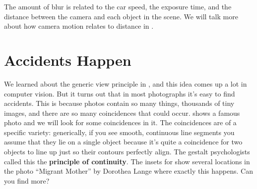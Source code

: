The amount of blur is related to the car speed, the exposure time, and the distance between the camera and each object in the scene. We will talk more about how camera motion relates to distance in \chap{\ref{chapter:3D_motion_and_its_2D_projection}}.

\section{Accidents Happen}

We learned about the generic view principle in \chap{\ref{chapter:simplesystem}}, and this idea comes up a lot in computer vision. But it turns out that in most photographs it's easy to find accidents. This is because photos contain so many things, thousands of tiny images, and there are so many coincidences that could occur. \Fig{\ref{fig:visionscience:migrant_mother}} shows a famous photo and we will look for some coincidences in it. The coincidences are of a specific variety: generically, if you see smooth, continuous line segments you assume that they lie on a single object because it's quite a coincidence for two objects to line up just so their contours perfectly align. The gestalt psychologists called this the {\bf principle of continuity}. The insets  for \fig{\ref{fig:visionscience:migrant_mother}} show several locations in the photo ``Migrant Mother'' by Dorothea Lange where exactly this happens. Can you find more?

